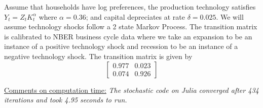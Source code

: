 \documentclass{article} %
\theoremstyle{definition}
\begin{document}
	Assume that households have log preferences, the production technology satisfies $Y_t = Z_tK_t^\alpha$ where $\alpha = 0.36$; and capital depreciates at rate $\delta = 0.025$. We will
	assume technology shocks follow a 2 state Markov Process. The transition matrix is calibrated to NBER business cycle data where we take an expansion to be an instance of a positive technology shock and recession to be an instance of a negative technology shock. The transition matrix is given by
	\[\begin{bmatrix}
		0.977 & 0.023 \\0.074 & 0.926
	\end{bmatrix}\]

\underline{Comments on computation time:} \textit{The stochastic code on Julia converged after 434 iterations and took 4.95 seconds to run.}
\end{document}
